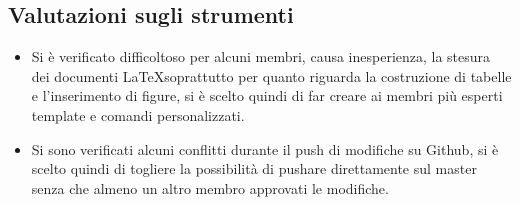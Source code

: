 \subsection{Valutazioni sugli strumenti}
\begin{itemize}
\item Si è verificato difficoltoso per alcuni membri, causa inesperienza, la stesura dei documenti \LaTeX  soprattutto per quanto riguarda la costruzione di tabelle e l'inserimento di figure, si è scelto quindi di far creare ai membri più esperti template e comandi personalizzati.
\item Si sono verificati alcuni conflitti durante il push di modifiche su Github, si è scelto quindi di togliere la possibilità di pushare direttamente sul master senza che almeno un altro membro approvati le modifiche. 
\end{itemize}